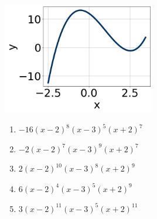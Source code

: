 \documentclass[14pt]{extbook}
\begin{document}
\begin{enumerate}
{\begin{center}
    \includegraphics[width=0.5\textwidth]{../Figures/polyGraphToFunctionC.png}
\end{center}
\begin{enumerate}[label=\Alph*.]
\item \( -16(x - 2)^{8} (x - 3)^{5} (x + 2)^{7} \)
\item \( -2(x - 2)^{7} (x - 3)^{9} (x + 2)^{7} \)
\item \( 2(x - 2)^{10} (x - 3)^{8} (x + 2)^{9} \)
\item \( 6(x - 2)^{4} (x - 3)^{5} (x + 2)^{9} \)
\item \( 3(x - 2)^{11} (x - 3)^{5} (x + 2)^{11} \)


\end{enumerate}}
\end{enumerate}
\end{document}
